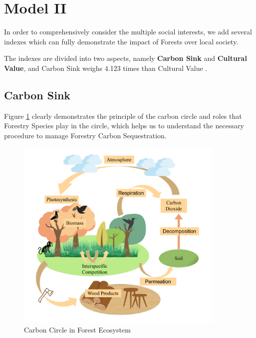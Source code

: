 \documentclass{mcmthesis}
\numberwithin{figure}{section}
\numberwithin{table}{section}
\numberwithin{equation}{section}
\begin{document}


\newpage




\section{Model II}


In order to comprehensively consider the multiple social interests, we add
several indexes which can fully demonstrate the impact of Forests over local 
society. 
\par
The indexes are divided into two aspects, namely \textbf{Carbon Sink} and \textbf{Cultural Value}, and
Carbon Sink weighs 4.123 times than Cultural Value \citep{2007US}. 

\subsection{Carbon Sink}
Figure \ref{CarbonCircle} clearly demonstrates the principle of the carbon circle and roles that Forestry Species play in the 
circle, which helps us to understand the necessary procedure to manage Forestry Carbon Sequestration.

\begin{figure}[htbp]
  \centering
  \includegraphics[width = 10cm]{code&pic/大循环.pdf}
  \caption{Carbon Circle in Forest Ecosystem}\label{CarbonCircle}
\end{figure}
\end{document}
